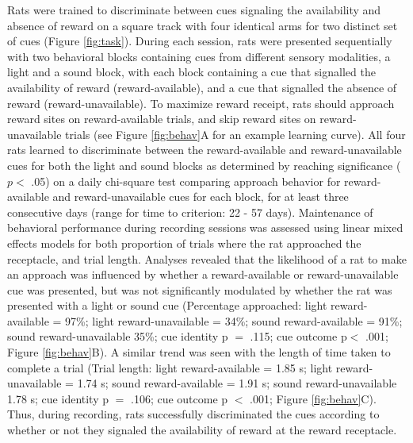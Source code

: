 \documentclass[11pt]{article}
\begin{document}
Rats were trained to discriminate between cues signaling the
availability and absence of reward on a square track with four
identical arms for two distinct set of cues (Figure
\ref{fig:task}). During each session, rats were presented sequentially
with two behavioral blocks containing cues from different sensory
modalities, a light and a sound block, with each block containing a
cue that signalled the availability of reward (reward-available), and
a cue that signalled the absence of reward (reward-unavailable). To
maximize reward receipt, rats should approach reward sites on
reward-available trials, and skip reward sites on reward-unavailable
trials (see Figure \ref{fig:behav}A for an example learning
curve). All four rats learned to discriminate between the
reward-available and reward-unavailable cues for both the light and
sound blocks as determined by reaching significance ($p <$ .05) on a
daily chi-square test comparing approach behavior for reward-available
and reward-unavailable cues for each block, for at least three
consecutive days (range for time to criterion: 22 - 57
days). Maintenance of behavioral performance during recording sessions
was assessed using linear mixed effects models for both proportion of
trials where the rat approached the receptacle, and trial
length. Analyses revealed that the likelihood of a rat to make an
approach was influenced by whether a reward-available or
reward-unavailable cue was presented, but was not significantly
modulated by whether the rat was presented with a light or sound cue
(Percentage approached: light reward-available = 97\%; light
reward-unavailable = 34\%; sound reward-available = 91\%; sound
reward-unavailable 35\%; cue identity p $=$ .115; cue outcome p$<$
.001; Figure \ref{fig:behav}B). A similar trend was seen with the
length of time taken to complete a trial (Trial length: light
reward-available = 1.85 s; light reward-unavailable = 1.74 s; sound
reward-available = 1.91 s; sound reward-unavailable 1.78 s; cue
identity p $=$ .106; cue outcome p $<$ .001; Figure
\ref{fig:behav}C). Thus, during recording, rats successfully
discriminated the cues according to whether or not they signaled the
availability of reward at the reward receptacle.
\end{document}
